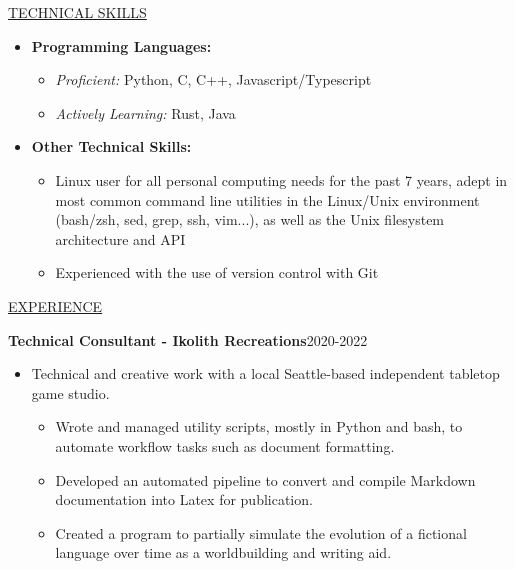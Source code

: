 \documentclass[11pt]{article}
\newcommand{\betteruline}[1]{
    \uline{#1}
}
\newcommand{\sectiontitle}[1]{
    \begingroup
        \titlebold
        \betteruline{\Large\uppercase{#1}  }
        \vspace{1.7mm}
    \endgroup
}
\newcommand{\sectioncontent}[1]{
    \begingroup
        \begin{FlushLeft}
        \vspace{-3mm}
        \sffamily\small#1
        \end{FlushLeft}
    \endgroup
    \vspace{2mm}
}
\begin{document}
\begin{paracol}{2}
{\begin{itemize}
      \end{itemize}
    }

    \switchcolumn
    

    \sectiontitle{Technical Skills}
    \sectioncontent{
      \begin{itemize}
        \item \textbf{Programming Languages: }
          \begin{itemize}
            \item \textit{Proficient:} Python, C, C++, Javascript/Typescript
            \item \textit{Actively Learning:} Rust, Java
          \end{itemize}

        \item \textbf{Other Technical Skills:}
          \begin{itemize}
            \item  Linux user for all personal computing needs for the past 7 years, adept in most common command line utilities in the Linux/Unix environment (bash/zsh, sed, grep, ssh, vim...), as well as the Unix filesystem architecture and API
            \item Experienced with the use of version control with Git
          \end{itemize}
      \end{itemize}
    }

        \sectiontitle{Experience} 
        \sectioncontent{
        \begingroup
      \textbf{Technical Consultant - Ikolith Recreations}\hfill\color{black!70}\small{2020-2022}
        \endgroup
      \begin{itemize}
          \item Technical and creative work with a local Seattle-based independent tabletop game studio. 
              \begin{itemize}
                  \item Wrote and managed utility scripts, mostly in Python and bash, to automate workflow tasks such as document formatting.
                    \item Developed an automated pipeline to convert and compile Markdown documentation into Latex for publication.
                    \item Created a program to partially simulate the evolution of a fictional language over time as a worldbuilding and writing aid.
                        
                        
              \end{itemize}
        \end{itemize}
        }



\end{paracol}
\end{document}
